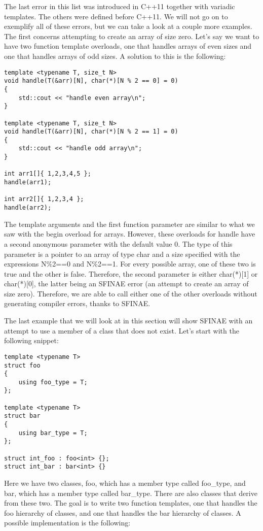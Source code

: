 The last error in this list was introduced in C++11 together with variadic templates. The others were defined before C++11. We will not go on to exemplify all of these errors, but we can take a look at a couple more examples. The first concerns attempting to create an array of size zero. Let’s say we want to have two function template overloads, one that handles arrays of even sizes and one that handles arrays of odd sizes. A solution to this is the following:

\begin{lstlisting}[style=styleCXX]
template <typename T, size_t N>
void handle(T(&arr)[N], char(*)[N % 2 == 0] = 0)
{
	std::cout << "handle even array\n";
}

template <typename T, size_t N>
void handle(T(&arr)[N], char(*)[N % 2 == 1] = 0)
{
	std::cout << "handle odd array\n";
}

int arr1[]{ 1,2,3,4,5 };
handle(arr1);

int arr2[]{ 1,2,3,4 };
handle(arr2);
\end{lstlisting}

The template arguments and the first function parameter are similar to what we saw with the begin overload for arrays. However, these overloads for handle have a second anonymous parameter with the default value 0. The type of this parameter is a pointer to an array of type char and a size specified with the expressions N\%2==0 and N\%2==1. For every possible array, one of these two is true and the other is false. Therefore, the second parameter is either char(*)[1] or char(*)[0], the latter being an SFINAE error (an attempt to create an array of size zero). Therefore, we are able to call either one of the other overloads without generating compiler errors, thanks to SFINAE.

The last example that we will look at in this section will show SFINAE with an attempt to use a member of a class that does not exist. Let’s start with the following snippet:

\begin{lstlisting}[style=styleCXX]
template <typename T>
struct foo
{
	using foo_type = T;
};

template <typename T>
struct bar
{
	using bar_type = T;
};

struct int_foo : foo<int> {};
struct int_bar : bar<int> {}
\end{lstlisting}

Here we have two classes, foo, which has a member type called foo\_type, and bar, which has a member type called bar\_type. There are also classes that derive from these two. The goal is to write two function templates, one that handles the foo hierarchy of classes, and one that handles the bar hierarchy of classes. A possible implementation is the following:

